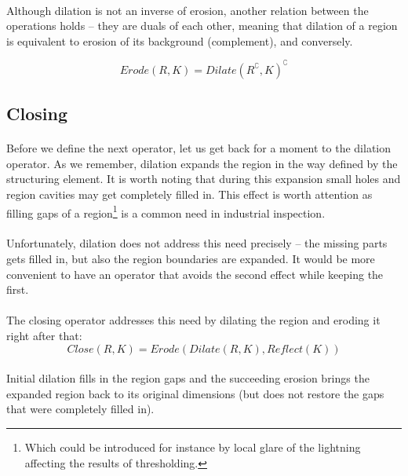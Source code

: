 \paragraph*{}
Although dilation is not an inverse of erosion, another relation between the operations holds -- they are duals of each other, meaning that dilation of a region is equivalent to erosion of its background (complement), and conversely.

\[
	Erode(R, K) = Dilate(R^{\complement}, K)^{\complement}
\]

\subsection{Closing}

\paragraph*{}
Before we define the next operator, let us get back for a moment to the dilation operator. As we remember, dilation expands the region in the way defined by the structuring element. It is worth noting that during this expansion small holes and region cavities may get completely filled in. This effect is worth attention as filling gaps of a region\footnote{Which could be introduced for instance by local glare of the lightning affecting the results of thresholding.} is a common need in industrial inspection.

\paragraph*{}
Unfortunately, dilation does not address this need precisely -- the missing parts gets filled in, but also the region boundaries are expanded. It would be more convenient to have an operator that avoids the second effect while keeping the first.

\paragraph*{}
The closing operator addresses this need by dilating the region and eroding it right after that:
\[
	Close(R,K) = Erode(Dilate(R, K), Reflect(K))
\] 

\paragraph*{}
Initial dilation fills in the region gaps and the succeeding erosion brings the expanded region back to its original dimensions (but does not restore the gaps that were completely filled in). 

